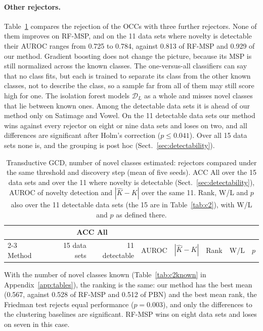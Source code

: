 \documentclass[pdflatex,sn-basic]{sn-jnl}
\newcommand{\DL}{\mathcal{D}_L}
\begin{document}
\paragraph{Other rejectors.} Table~\ref{tab:rejectors} compares the rejection of the OCCs with three further rejectors. None of them improves on RF-MSP, and on the 11 data sets where novelty is detectable their AUROC ranges from 0.725 to 0.784, against 0.813 of RF-MSP and 0.929 of our method. Gradient boosting does not change the picture, because its MSP is still normalized across the known classes. The one-versus-all classifiers can say that no class fits, but each is trained to separate its class from the other known classes, not to describe the class, so a sample far from all of them may still score high for one. The isolation forest models $\DL$ as a whole and misses novel classes that lie between known ones. Among the detectable data sets it is ahead of our method only on Satimage and Vowel. On the 11 detectable data sets our method wins against every rejector on eight or nine data sets and loses on two, and all differences are significant after Holm's correction ($p \le 0.041$). Over all 15 data sets none is, and the grouping is post hoc (Sect.~\ref{sec:detectability}).

\begin{table}[t]
\caption{Transductive GCD, number of novel classes estimated: rejectors compared under the same threshold and discovery step (mean of five seeds). ACC All over the 15 data sets and over the 11 where novelty is detectable (Sect.~\ref{sec:detectability}), AUROC of novelty detection and $|\hat K - K|$ over the same 11. Rank, W/L and $p$ also over the 11 detectable data sets (the 15 are in Table~\ref{tab:c2}), with W/L and $p$ as defined there.}\label{tab:rejectors}
\centering\footnotesize
\begin{tabular}{@{}lrrrrrrr@{}}
\toprule
 & \multicolumn{2}{c}{ACC All} & & & & & \\
\cmidrule(lr){2-3}
Method & 15 data sets & 11 detectable & AUROC & $|\hat K - K|$ & Rank & W/L & $p$ \\
\midrule

\end{tabular}
\end{table}

With the number of novel classes known (Table~\ref{tab:c2known} in Appendix~\ref{app:tables}), the ranking is the same: our method has the best mean (0.567, against 0.528 of RF-MSP and 0.512 of PBN) and the best mean rank, the Friedman test rejects equal performance ($p = 0.003$), and only the differences to the clustering baselines are significant. RF-MSP wins on eight data sets and loses on seven in this case.
\end{document}
